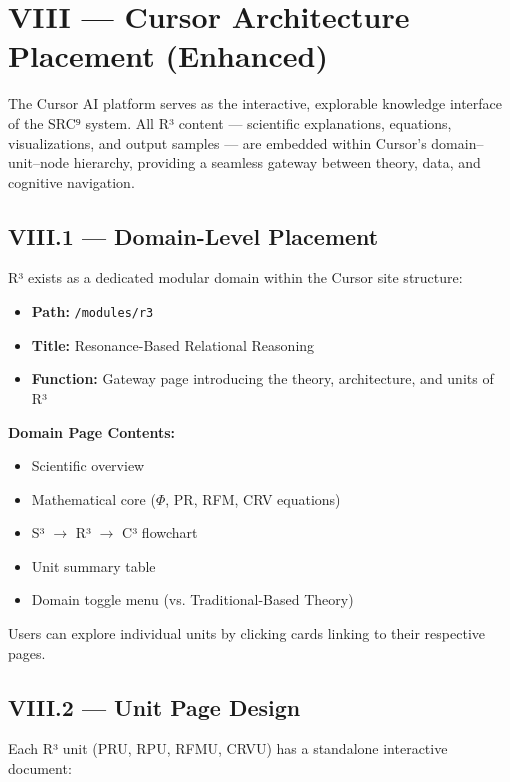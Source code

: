 \section*{VIII — Cursor Architecture Placement (Enhanced)}

The Cursor AI platform serves as the interactive, explorable knowledge interface of the SRC⁹ system. All R³ content — scientific explanations, equations, visualizations, and output samples — are embedded within Cursor's domain–unit–node hierarchy, providing a seamless gateway between theory, data, and cognitive navigation.

\subsection*{VIII.1 — Domain-Level Placement}

R³ exists as a dedicated modular domain within the Cursor site structure:

\begin{itemize}
    \item \textbf{Path:} \texttt{/modules/r3}
    \item \textbf{Title:} Resonance-Based Relational Reasoning
    \item \textbf{Function:} Gateway page introducing the theory, architecture, and units of R³
\end{itemize}

\textbf{Domain Page Contents:}

\begin{itemize}
    \item Scientific overview
    \item Mathematical core ($\Phi$, PR, RFM, CRV equations)
    \item S³ $\rightarrow$ R³ $\rightarrow$ C³ flowchart
    \item Unit summary table
    \item Domain toggle menu (vs. Traditional-Based Theory)
\end{itemize}

Users can explore individual units by clicking cards linking to their respective pages.

\subsection*{VIII.2 — Unit Page Design}

Each R³ unit (PRU, RPU, RFMU, CRVU) has a standalone interactive document:

